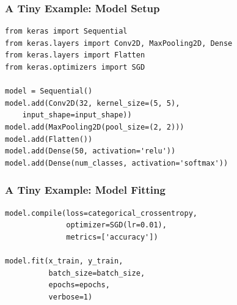 \documentclass{beamer}
\begin{document}


\begin{frame}[fragile]
\frametitle{A Tiny Example: Model Setup}
\begin{verbatim}
from keras import Sequential
from keras.layers import Conv2D, MaxPooling2D, Dense
from keras.layers import Flatten
from keras.optimizers import SGD

model = Sequential()
model.add(Conv2D(32, kernel_size=(5, 5), 
	input_shape=input_shape))
model.add(MaxPooling2D(pool_size=(2, 2)))
model.add(Flatten())
model.add(Dense(50, activation='relu'))
model.add(Dense(num_classes, activation='softmax'))
\end{verbatim}
\end{frame}

\begin{frame}[fragile]
\frametitle{A Tiny Example: Model Fitting}
\begin{verbatim}
model.compile(loss=categorical_crossentropy,
              optimizer=SGD(lr=0.01),
              metrics=['accuracy'])

model.fit(x_train, y_train,
          batch_size=batch_size,
          epochs=epochs,
          verbose=1)
\end{verbatim}
\end{frame}
\end{document}

